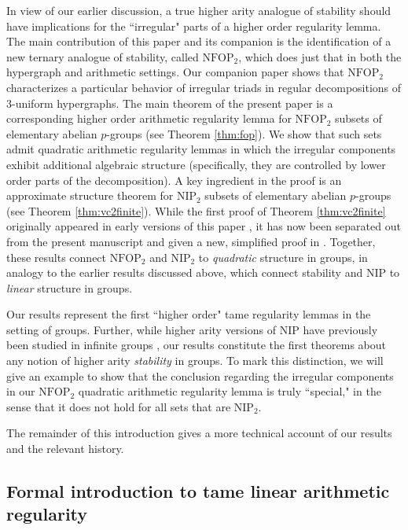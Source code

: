 \documentclass[12pt,oneside,british,a4wide]{amsart}
\numberwithin{equation}{section}
\theoremstyle{definition}
\def\NFOP{\mathrm{NFOP}}
\def\NIP{\mathrm{NIP}}
\begin{document}
In view of our earlier discussion, a true higher arity analogue of stability should have implications for the ``irregular" parts of a higher order regularity lemma. The main contribution of this paper and its companion is the identification of a new ternary analogue of stability, called $\NFOP_2$, which does just that  in both the hypergraph and arithmetic settings.  Our companion paper \cite{Terry.2021b} shows that $\NFOP_2$ characterizes a particular behavior of irregular triads in regular decompositions of 3-uniform hypergraphs.  The main theorem of the present paper is a corresponding higher order arithmetic regularity lemma for $\NFOP_2$ subsets of elementary abelian $p$-groups (see Theorem \ref{thm:fop}). We show that such sets admit quadratic arithmetic regularity lemmas in which the irregular components exhibit additional algebraic structure (specifically, they are controlled by lower order parts of the decomposition).  A key ingredient in the proof is an approximate structure theorem for $\NIP_2$ subsets of elementary abelian $p$-groups (see Theorem \ref{thm:vc2finite}).  While the first proof of Theorem \ref{thm:vc2finite} originally appeared in early versions of this paper \cite{Terry.2021av2}, it has now been separated out from the present manuscript and given a new, simplified proof in \cite{Terry.2021d}.   Together, these results connect $\NFOP_2$ and $\NIP_2$ to \emph{quadratic} structure in groups, in analogy to the earlier results discussed above, which connect stability and NIP to \emph{linear} structure in groups.  
  
 

 Our results represent the first ``higher order" tame regularity lemmas in the setting of groups. Further, while higher arity versions of NIP  have previously been studied in infinite groups \cite{Chernikov.2021, Hempel.2014}, our results constitute the first theorems about any notion of higher arity \emph{stability} in groups. To mark this distinction, we will give an example to show that the conclusion regarding the irregular components in our $\NFOP_2$ quadratic arithmetic regularity lemma is truly ``special," in the sense that it does not hold for all sets that are $\NIP_2$.  

The remainder of this introduction gives a more technical account of our results and the relevant history.


\subsection{Formal introduction to tame linear arithmetic regularity}\label{subsec:introlinear}
\end{document}
